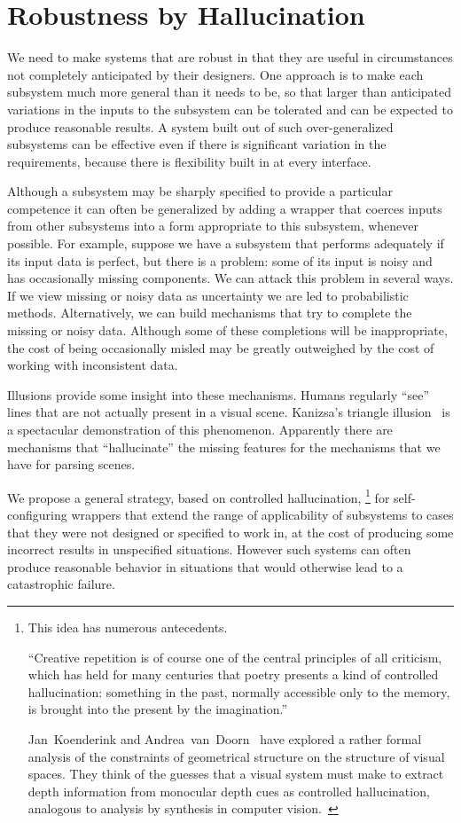 \documentclass[letterpaper]{article}
\begin{document}
\section{Robustness by Hallucination}

We need to make systems that are robust in that they are useful in
circumstances not completely anticipated by their designers.  One
approach is to make each subsystem much more general than it needs to
be, so that larger than anticipated variations in the inputs to the
subsystem can be tolerated and can be expected to produce reasonable
results.  A system built out of such over-generalized subsystems can be
effective even if there is significant variation in the requirements,
because there is flexibility built in at every interface.

Although a subsystem may be sharply specified to provide a particular
competence it can often be generalized by adding a wrapper that
coerces inputs from other subsystems into a form appropriate to this
subsystem, whenever possible.  For example, suppose we have a
subsystem that performs adequately if its input data is perfect, but
there is a problem: some of its input is noisy and has occasionally
missing components.  We can attack this problem in several ways.  If
we view missing or noisy data as uncertainty we are led to
probabilistic methods.  Alternatively, we can build mechanisms that
try to complete the missing or noisy data.  Although some of these
completions will be inappropriate, the cost of being occasionally
misled may be greatly outweighed by the cost of working with
inconsistent data.

Illusions provide some insight into these mechanisms.  Humans
regularly ``see'' lines that are not actually present in a visual
scene.  Kanizsa's triangle
illusion~\cite{kanizsa79,gregory77,nieder02} is a spectacular
demonstration of this phenomenon.  Apparently there are mechanisms
that ``hallucinate'' the missing features for the mechanisms that we
have for parsing scenes.

We propose a general strategy, based on controlled hallucination,%
\footnote{This idea has numerous antecedents.  

  ``Creative repetition is of course one of the central principles of
  all criticism, which has held for many centuries that poetry
  presents a kind of controlled hallucination: something in the past,
  normally accessible only to the memory, is brought into the present
  by the imagination.''~\cite{frye}

  Jan~Koenderink and Andrea~van~Doorn~\cite{Koenderink08} have
  explored a rather formal analysis of the constraints of geometrical
  structure on the structure of visual spaces.  They think of the
  guesses that a visual system must make to extract depth information
  from monocular depth cues as controlled hallucination, analogous
  to analysis by synthesis in computer vision.~\cite{ullman}}
for self-configuring wrappers that extend the range of applicability
of subsystems to cases that they were not designed or specified to
work in, at the cost of producing some incorrect results in
unspecified situations.  However such systems can often produce
reasonable behavior in situations that would otherwise lead to a
catastrophic failure.
\end{document}
